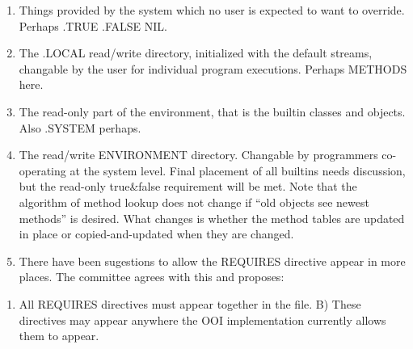 \begin{enumerate}
\def\labelenumi{\arabic{enumi}.}
\item
  Things provided by the system which no user is expected to want to
  override. Perhaps .TRUE .FALSE NIL.
\item
  The .LOCAL read/write directory, initialized with the default streams,
  changable by the user for individual program executions. Perhaps
  METHODS here.
\item
  The read-only part of the environment, that is the builtin classes and
  objects. Also .SYSTEM perhaps.
\item
  The read/write ENVIRONMENT directory. Changable by programmers
  co-operating at the system level. Final placement of all builtins
  needs discussion, but the read-only true\&false requirement will be
  met. Note that the algorithm of method lookup does not change if ``old
  objects see newest methods'' is desired. What changes is whether the
  method tables are updated in place or copied-and-updated when they are
  changed.
\item
  There have been sugestions to allow the REQUIRES directive appear in
  more places. The committee agrees with this and proposes:
\end{enumerate}

\begin{enumerate}
\def\labelenumi{\Alph{enumi})}
\tightlist
\item
  All REQUIRES directives must appear together in the file. B) These
  directives may appear anywhere the OOI implementation currently allows
  them to appear.
\end{enumerate}

